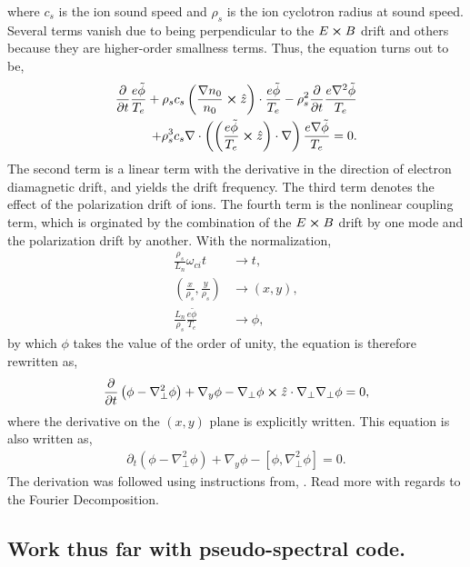 where $c_s$ is the ion sound speed and $\rho_s$ is the ion cyclotron radius at sound speed. Several terms vanish due to being perpendicular to the $E \cross B$ drift and others because they are higher-order smallness terms. Thus, the equation turns out to be, 
\begin{align}
\begin{split}
	\frac{\partial}{\partial t} \frac{e \tilde{\phi}}{T_e} + \rho_s c_s \left(\frac{\nabla n_0}{n_0} \cross \hat{z} \right) \cdot \frac{e \tilde{\phi}}{T_e} - \rho_s^2 \frac{\partial}{\partial t} \frac{e \nabla^2 \tilde{\phi}}{T_e} \\
	+ \rho_s^3 c_s \nabla \cdot \left( \left(\frac{e \tilde{\phi}}{T_e} \cross \hat{z} \right) \cdot \nabla \right) \frac{e \nabla \tilde{\phi}}{T_e} = 0.
\end{split}
\end{align} 
The second term is a linear term with the derivative in the direction of electron diamagnetic drift, and yields the drift frequency. The third term denotes the effect of the polarization drift of ions. The fourth term is the nonlinear coupling term, which is orginated by the combination of the $E \cross B$ drift by one mode and the polarization drift by another. With the normalization, 
\begin{align}
	\frac{\rho_s}{L_n} \omega_{ci} t &\rightarrow t, \\
	\left(\frac{x}{\rho_s}, \frac{y}{\rho_s} \right) &\rightarrow (x,y), \\
	\frac{L_n}{\rho_s} \frac{e \tilde{\phi}}{T_e} &\rightarrow \phi, 
\end{align}
by which $\phi$ takes the value of the order of unity, the equation is therefore rewritten as, 
\begin{align}
	\frac{\partial}{\partial t} \left(\phi - \nabla_{\perp}^2 \phi \right) + \nabla_y \phi - \nabla_{\perp} \phi \cross \hat{z} \cdot \nabla_{\perp} \nabla_{\perp} \phi = 0,
\end{align}
where the derivative on the $(x,y)$ plane is explicitly written. This equation is also written as, 
\begin{align}
	\partial_t \left(\phi - \nabla_{\perp}^2 \phi \right) + \nabla_y \phi - \left[\phi, \nabla_{\perp}^2 \phi \right] = 0.
\end{align}
The derivation was followed using instructions from, \cite{diamond_itoh_itoh_2010}. Read more with regards to the Fourier Decomposition. 

\subsection{Work thus far with pseudo-spectral code.}

